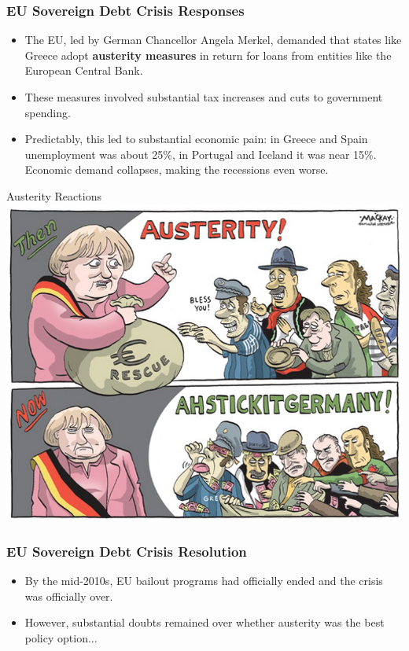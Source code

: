 \documentclass[handout]{beamer}
\begin{document}
\begin{frame} 
	\frametitle{\LARGE{EU Sovereign Debt Crisis Responses}}
	
	\begin{itemize}
		\item The EU, led by German Chancellor Angela Merkel, demanded that states like Greece adopt \textbf{austerity measures} in return for loans from entities like the European Central Bank. \pause
		\item These measures involved substantial tax increases and cuts to government spending. \pause
		\item Predictably, this led to substantial economic pain: in Greece and Spain unemployment was about 25\%, in Portugal and Iceland it was near 15\%. Economic demand collapses, making the recessions even worse.
	\end{itemize}
\end{frame}

\begin{frame}{\LARGE Austerity Reactions}
	\centering
	\includegraphics[width=\textwidth,height=\textheight,keepaspectratio]{Austeritycartoon.jpg}
\end{frame}

\begin{frame} 
	\frametitle{\LARGE{EU Sovereign Debt Crisis Resolution}}
	\begin{itemize}
		\item By the mid-2010s, EU bailout programs had officially ended and the crisis was officially over. \pause
		\item However, substantial doubts remained over whether austerity was the best policy option...
	\end{itemize}
\end{frame}
\end{document}
